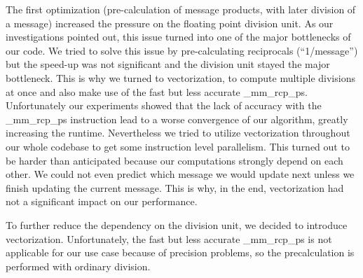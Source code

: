 The first optimization (pre-calculation of message products, with later division of a message) increased the pressure on the floating point division unit. As our investigations pointed out, this issue turned into one of the major bottlenecks of our code. We tried to solve this issue by pre-calculating reciprocals (“1/message”) but the speed-up was not significant and the division unit stayed the major bottleneck. This is why we turned to vectorization, to compute multiple divisions at once and also make use of the fast but less accurate \_mm\_rcp\_ps. Unfortunately our experiments showed that the lack of accuracy with the \_mm\_rcp\_ps instruction lead to a worse convergence of our algorithm, greatly increasing the runtime. Nevertheless we tried to utilize vectorization throughout our whole codebase to get some instruction level parallelism. This turned out to be harder than anticipated because our computations strongly depend on each other. We could not even predict which message we would update next unless we finish updating the current message. This is why, in the end, vectorization had not a significant impact on our performance.

To further reduce the dependency on the division unit, we decided to introduce vectorization.
Unfortunately, the fast but less accurate \_mm\_rcp\_ps is not applicable for our use case because of precision problems, so the precalculation is performed with ordinary division.





